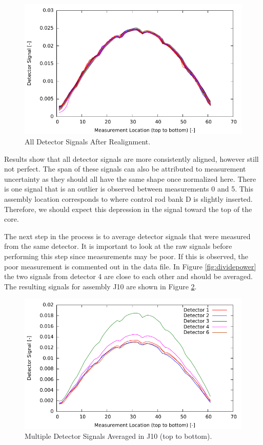 \begin{figure}[htbp]
    \centering
    \includegraphics{expdata/figs/after_realign.pdf}
    \caption{All Detector Signals After Realignment. \label{fig:afterrealign}}
\end{figure}
Results show that all detector signals are more consistently aligned, however still not perfect. The span of these signals can also be attributed to measurement uncertainty as they should all have the same shape once normalized here. There 
is one signal that is an outlier is observed between measurements 
0 and 5. This assembly location corresponds to where control rod bank D 
is slightly inserted. Therefore, we should expect this depression in the signal toward 
the top of the core.

The next step in the process is to average detector signals that were measured from
the same detector. It is important to look at the raw signals before performing this
step since measurements may be poor. If this is observed, the poor measurement
is commented out in the data file. In Figure \ref{fig:dividepower} the two signals
from detector 4 are close to each other and should be averaged. The resulting signals
for assembly J10 are shown in Figure \ref{fig:averagemultiple}.
\begin{figure}[htbp]
    \centering
    \includegraphics{expdata/figs/average_multiple.pdf}
    \caption{Multiple Detector Signals Averaged in J10 (top to bottom). \label{fig:averagemultiple}}
\end{figure}

